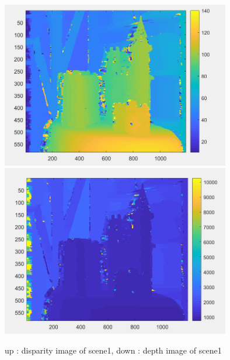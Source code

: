 \pagebreak
\begin{figure}[h]
    \centering
    \includegraphics[width=10cm]{result4.png}
    \includegraphics[width=10cm]{result5.png}
    \caption{up : disparity image of scene1, down : depth image of scene1}
    \label{fig:result1}
\end{figure}
\pagebreak
